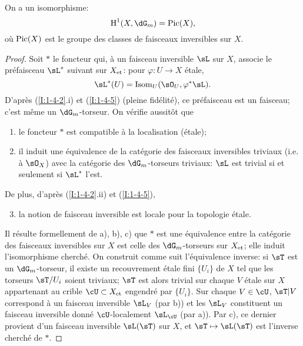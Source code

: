 \begin{proposition}\label{I:2-2-3}
On a un isomorphisme:
\[
  \h^1(X,\dG_m) = \pic(X)\text{,}
\]
où $\operatorname{Pic}(X)$ est le groupe des classes de faisceaux inversibles sur $X$.
\end{proposition}
\begin{proof}
Soit $*$ le foncteur qui, à un faisceau inversible $\sL$ sur $X$, associe le 
préfaisceau $\sL^*$ suivant sur ${X}_{\textnormal{et}}$: pour $\varphi:U\to X$ étale, 
\[
  \sL^*(U)=\operatorname{Isom}_U(\sO_U,\varphi^*\sL)\text{.}
\]
D'après (\ref{I:1-4-2}.i) et (\ref{I:1-4-5}) (pleine fidélité), ce 
préfaisceau est un faisceau; c'est même un $\dG_m$-torseur. On vérifie 
aussitôt que 
\begin{enumerate}[\indent a)]
  \item le foncteur $*$ est compatible à la localisation (étale);
  \item il induit une équivalence de la catégorie des faisceaux 
    inversibles triviaux (i.e. à $\sO_X$) avec la catégorie des 
    $\dG_m$-torseurs triviaux: $\sL$ est trivial si et seulement si $\sL^*$ 
    l'est.
\end{enumerate}

De plus, d'après (\ref{I:1-4-2}.ii) et (\ref{I:1-4-5}), 
\begin{enumerate}[\indent a)]
\setcounter{enumi}{2}
  \item la notion de faisceau inversible est locale pour la topologie étale. 
\end{enumerate}

Il résulte formellement de a), b), c) que $*$ est une équivalence entre la 
catégorie des faisceaux inversibles sur $X$ est celle des $\dG_m$-torseurs 
sur ${X}_{\textnormal{et}}$; elle induit l'isomorphisme cherché. On construit comme suit 
l'équivalence inverse: si $\sT$ est un $\dG_m$-torseur, il existe un 
recouvrement étale fini $\{U_i\}$ de $X$ tel que les torseurs $\sT/U_i$ soient 
triviaux; $\sT$ est alors trivial sur chaque $V$ étale sur $X$ appartenant au 
crible $\cU\subset \et X$ engendré par $\{U_i\}$. Sur chaque 
$V\in\cU$, $\sT|V$ correspond à un faisceau inversible $\sL_V$ (par b)) et les 
$\sL_V$ constituent un faisceau inversible donné $\cU$-localement $\sL_\cU$ 
(par a)). Par c), ce dernier provient d'un faisceau inversible $\sL(\sT)$ sur 
$X$, et $\sT\mapsto \sL(\sT)$ est l'inverse cherché de $*$. 
\end{proof}





